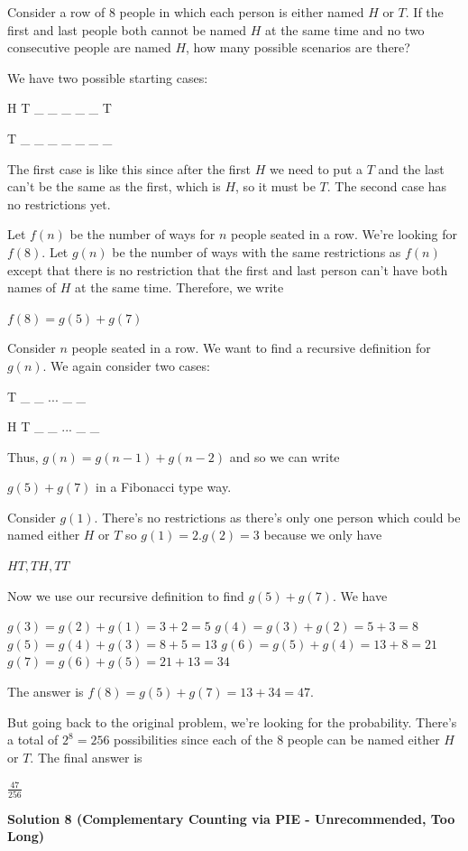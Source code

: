 \begin{enumerate}
 Consider a row of $8$ people in which each person is either named $H$ or $T$. If the first and last people both cannot be named $H$ at the same time and no two consecutive people are named $H$, how many possible scenarios are there?

 We have two possible starting cases:

 H T \_ \_ \_ \_ \_ T

 T \_ \_ \_ \_ \_ \_ \_

 The first case is like this since after the first $H$ we need to put a $T$ and the last can't be the same as the first, which is $H$, so it must be $T$. The second case has no restrictions yet. 

 Let $f(n)$ be the number of ways for $n$ people seated in a row. We're looking for $f(8)$. Let $g(n)$ be the number of ways with the same restrictions as $f(n)$ except that there is no restriction that the first and last person can't have both names of $H$ at the same time. Therefore, we write

 $f(8) = g(5) + g(7)$

 Consider $n$ people seated in a row. We want to find a recursive definition for $g(n)$. We again consider two cases:

 T \_ \_ ... \_ \_

 H T \_ \_ ... \_ \_

 Thus, $g(n) = g(n - 1) + g(n - 2)$ and so we can write

 $g(5) + g(7)$ in a Fibonacci type way.

 Consider $g(1)$. There's no restrictions as there's only one person which could be named either $H$ or $T$ so $g(1) = 2$.$g(2) = 3$ because we only have

 $HT, TH, TT$

 Now we use our recursive definition to find $g(5) + g(7)$. We have

 $g(3) = g(2) + g(1) = 3 + 2 = 5$
$g(4) = g(3) + g(2) = 5 + 3 = 8$
$g(5) = g(4) + g(3) = 8 + 5 = 13$
$g(6) = g(5) + g(4) = 13 + 8 = 21$
$g(7) = g(6) + g(5) = 21 + 13 = 34$

 The answer is $f(8) = g(5) + g(7) = 13 + 34 = 47$. 

 But going back to the original problem, we're looking for the probability. There's a total of $2^8 = 256$ possibilities since each of the $8$ people can be named either $H$ or $T$. The final answer is 

 $\frac{47}{256}$




\textbf{Solution 8 (Complementary Counting via PIE - Unrecommended, Too Long)}


\end{enumerate}
